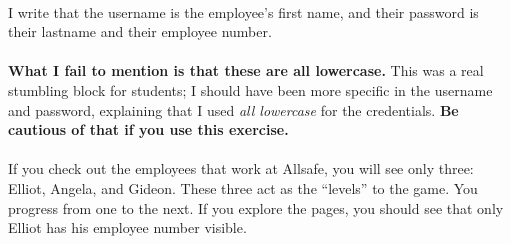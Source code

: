 \documentclass[11pt]{article}
\begin{document}
	\paragraph{} I write that the username is the employee's first name, and their password is their lastname and their employee number. 

	\paragraph{} \textbf{What I fail to mention is that these are all lowercase.} This was a real stumbling block for students; I should have been more specific in the username and password, explaining that I used \textit{all lowercase} for the credentials. \textbf{Be cautious of that if you use this exercise.}

	\paragraph{} If you check out the employees that work at Allsafe, you will see only three: Elliot, Angela, and Gideon. These three act as the ``levels'' to the game. You progress from one to the next. If you explore the pages, you should see that only Elliot has his employee number visible. \\

	\begin{center}
		\graphicspath{ {.} }
		\centering
	\end{center}		
\end{document}
